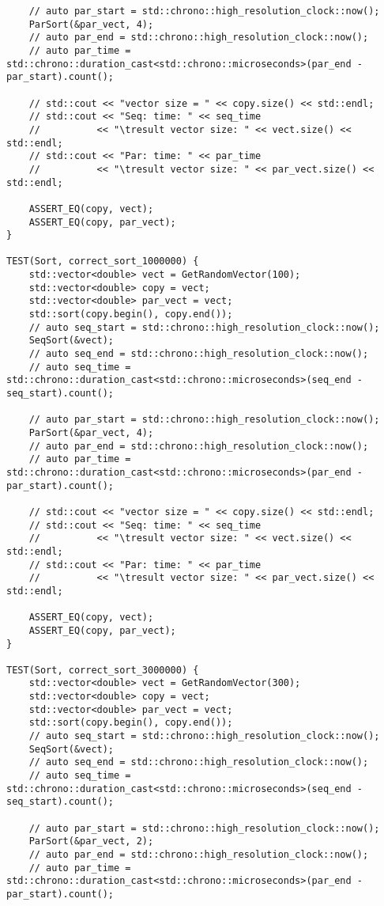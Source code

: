 \documentclass{report}
\begin{document}
\begin{lstlisting}
    // auto par_start = std::chrono::high_resolution_clock::now();
    ParSort(&par_vect, 4);
    // auto par_end = std::chrono::high_resolution_clock::now();
    // auto par_time = std::chrono::duration_cast<std::chrono::microseconds>(par_end - par_start).count();

    // std::cout << "vector size = " << copy.size() << std::endl;
    // std::cout << "Seq: time: " << seq_time
    //          << "\tresult vector size: " << vect.size() << std::endl;
    // std::cout << "Par: time: " << par_time
    //          << "\tresult vector size: " << par_vect.size() << std::endl;

    ASSERT_EQ(copy, vect);
    ASSERT_EQ(copy, par_vect);
}

TEST(Sort, correct_sort_1000000) {
    std::vector<double> vect = GetRandomVector(100);
    std::vector<double> copy = vect;
    std::vector<double> par_vect = vect;
    std::sort(copy.begin(), copy.end());
    // auto seq_start = std::chrono::high_resolution_clock::now();
    SeqSort(&vect);
    // auto seq_end = std::chrono::high_resolution_clock::now();
    // auto seq_time = std::chrono::duration_cast<std::chrono::microseconds>(seq_end - seq_start).count();

    // auto par_start = std::chrono::high_resolution_clock::now();
    ParSort(&par_vect, 4);
    // auto par_end = std::chrono::high_resolution_clock::now();
    // auto par_time = std::chrono::duration_cast<std::chrono::microseconds>(par_end - par_start).count();

    // std::cout << "vector size = " << copy.size() << std::endl;
    // std::cout << "Seq: time: " << seq_time
    //          << "\tresult vector size: " << vect.size() << std::endl;
    // std::cout << "Par: time: " << par_time
    //          << "\tresult vector size: " << par_vect.size() << std::endl;

    ASSERT_EQ(copy, vect);
    ASSERT_EQ(copy, par_vect);
}

TEST(Sort, correct_sort_3000000) {
    std::vector<double> vect = GetRandomVector(300);
    std::vector<double> copy = vect;
    std::vector<double> par_vect = vect;
    std::sort(copy.begin(), copy.end());
    // auto seq_start = std::chrono::high_resolution_clock::now();
    SeqSort(&vect);
    // auto seq_end = std::chrono::high_resolution_clock::now();
    // auto seq_time = std::chrono::duration_cast<std::chrono::microseconds>(seq_end - seq_start).count();

    // auto par_start = std::chrono::high_resolution_clock::now();
    ParSort(&par_vect, 2);
    // auto par_end = std::chrono::high_resolution_clock::now();
    // auto par_time = std::chrono::duration_cast<std::chrono::microseconds>(par_end - par_start).count();


\end{lstlisting}
\end{document}
